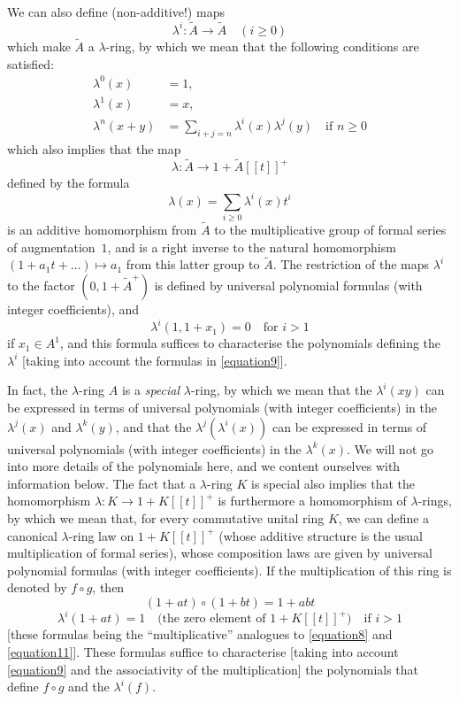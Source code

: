 \documentclass{article}
\theoremstyle{plain}
\theoremstyle{definition}
\renewcommand{\geq}{\geqslant}
\newcommand{\oldpage}[1]{\marginpar{\footnotesize$\Big\vert$ \textit{p.~#1}}}
\begin{document}
\begin{enumerate}
    We can also define (non-additive!) maps
    \[
      \lambda^i\colon \widetilde{A}\to\widetilde{A}
      \quad(i\geq0)
    \]
    which make $\widetilde{A}$ a $\lambda$-ring, by which we mean that the following conditions are satisfied:
    \[
    \label{equation9}
      \begin{aligned}
        \lambda^0(x) &= 1,
      \\\lambda^1(x) &= x,
      \\\lambda^n(x+y) &= \sum_{i+j=n}\lambda^i(x)\lambda^j(y)\quad\mbox{if $n\geq0$}
      \end{aligned}
    \tag{9}
    \]
    which also implies that the map
    \[
      \lambda\colon \widetilde{A} \to 1+\widetilde{A}[[t]]^+
    \]
    defined by the formula
    \[
    \label{equation10}
      \lambda(x) = \sum_{i\geq0} \lambda^i(x)t^i
    \tag{10}
    \]
    is an additive homomorphism from $\widetilde{A}$ to the multiplicative group of formal series of augmentation~$1$, and is a right inverse to the natural homomorphism $(1+a_1t+\ldots)\mapsto a_1$ from this latter group to $\widetilde{A}$.
    The restriction of the maps $\lambda^i$ to the factor $(0,1+\widetilde{A}^+)$ is defined by universal polynomial formulas (with integer coefficients), and
    \[
    \label{equation11}
      \lambda^i(1,1+x_1) = 0
      \quad\mbox{for $i>1$}
    \tag{11}
    \]
    if $x_1\in A^1$, and this formula suffices to characterise the polynomials defining the $\lambda^i$ [taking into account the formulas in \cref{equation9}].

\oldpage{149}
    In fact, the $\lambda$-ring $A$ is a \emph{special} $\lambda$-ring, by which we mean that the $\lambda^i(xy)$ can be expressed in terms of universal polynomials (with integer coefficients) in the $\lambda^j(x)$ and $\lambda^k(y)$, and that the $\lambda^j(\lambda^i(x))$ can be expressed in terms of universal polynomials (with integer coefficients) in the $\lambda^k(x)$.
    We will not go into more details of the polynomials here, and we content ourselves with information below.
    The fact that a $\lambda$-ring $K$ is special also implies that the homomorphism $\lambda\colon K\to 1+K[[t]]^+$ is furthermore a homomorphism of $\lambda$-rings, by which we mean that, for every commutative unital ring $K$, we can define a canonical $\lambda$-ring law on $1+K[[t]]^+$ (whose additive structure is the usual multiplication of formal series), whose composition laws are given by universal polynomial formulas (with integer coefficients).
    If the multiplication of this ring is denoted by $f\circ g$, then
    \[
    \label{equation12}
      (1+at)\circ(1+bt) = 1+abt
    \tag{12}
    \]
    \[
    \label{equation13}
      \lambda^i(1+at) = 1
      \quad\mbox{(the zero element of $1+K[[t]]^+$)}
      \quad\mbox{if $i>1$}
    \tag{13}
    \]
    [these formulas being the ``multiplicative'' analogues to \cref{equation8} and \cref{equation11}].
    These formulas suffice to characterise [taking into account \cref{equation9} and the associativity of the multiplication] the polynomials that define $f\circ g$ and the $\lambda^i(f)$.


\end{enumerate}
\end{document}
